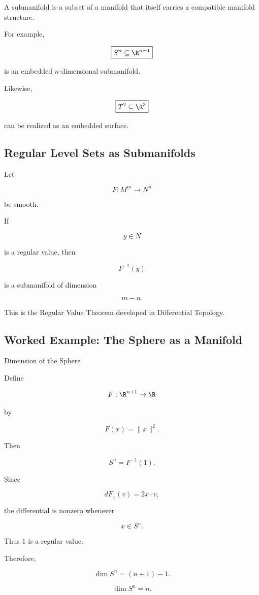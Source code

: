 A submanifold is a subset of a manifold that itself carries a compatible
manifold structure.

For example,

\[
\boxed{
S^n\subseteq\R^{n+1}
}
\]

is an embedded \(n\)-dimensional submanifold.

Likewise,

\[
\boxed{
T^2\subseteq\R^3
}
\]

can be realized as an embedded surface.

\subsection{Regular Level Sets as Submanifolds}
\label{subsec:regular-level-set-submanifolds}

Let

\[
F:M^m\to N^n
\]

be smooth.

If

\[
y\in N
\]

is a regular value, then

\[
\boxed{
F^{-1}(y)
}
\]

is a submanifold of dimension

\[
\boxed{
m-n.
}
\]

This is the Regular Value Theorem developed in Differential Topology.

\subsection{Worked Example: The Sphere as a Manifold}
\label{subsec:worked-sphere-manifold}

\begin{workedexamplebox}{Dimension of the Sphere}

Define

\[
F:\R^{n+1}\to\R
\]

by

\[
F(x)=\|x\|^2.
\]

Then

\[
S^n=F^{-1}(1).
\]

Since

\[
dF_x(v)=2x\cdot v,
\]

the differential is nonzero whenever

\[
x\in S^n.
\]

Thus \(1\) is a regular value.

Therefore,

\[
\dim S^n
=
(n+1)-1.
\]

\begin{answerbox}
\[
\boxed{
\dim S^n=n.
}
\]
\end{answerbox}
\end{workedexamplebox}

